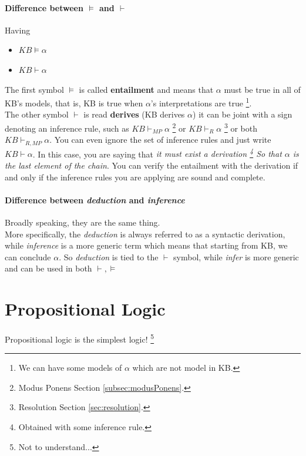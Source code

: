 \documentclass[10pt,a4paper]{article}
\begin{document}
\paragraph{Difference between $\models$ and $\vdash$}
Having 
\begin{itemize}
\item $KB\models \alpha$
\item $KB \vdash \alpha$
\end{itemize}
The first symbol $\models$  is called \textbf{entailment} and means that $\alpha$ must be true in all of KB's models, that is, KB  is true when $\alpha$'s interpretations are true \footnote{We can have some models of $\alpha$ which are not model in KB.}.\\
The other symbol $\vdash$ is read \textbf{derives} (KB derives $\alpha$) it can be joint with a sign denoting an inference rule, such as $KB \vdash_{MP}\alpha$ \footnote{Modus Ponens Section \ref{subsec:modusPonens}.} or $KB \vdash_{R}\alpha$ \footnote{Resolution Section \ref{sec:resolution}.} or both $KB \vdash_{R,MP}\alpha$. You can even ignore the set of inference rules and just write $KB \vdash\alpha$. In this case, you are saying that \textit{it must exist a derivation \footnote{Obtained with some inference rule.} So that $\alpha$ is the last element of the chain}. You can verify the entailment with the derivation if and only if the inference rules you are applying are sound and complete.


\paragraph{Difference between \textit{deduction} and \textit{inference}}
Broadly speaking, they are the same thing.\\
More specifically, the \textit{deduction} is always referred to as a syntactic derivation, while \textit{inference} is a more generic  term which means that starting from KB, we can conclude $\alpha$. So \textit{deduction} is tied to the $\vdash$ symbol, while \textit{infer} is more generic and can be used in both $\vdash, \models$

\newpage
\section{Propositional Logic}
Propositional logic is the simplest logic! \footnote{Not to understand...}
\end{document}
